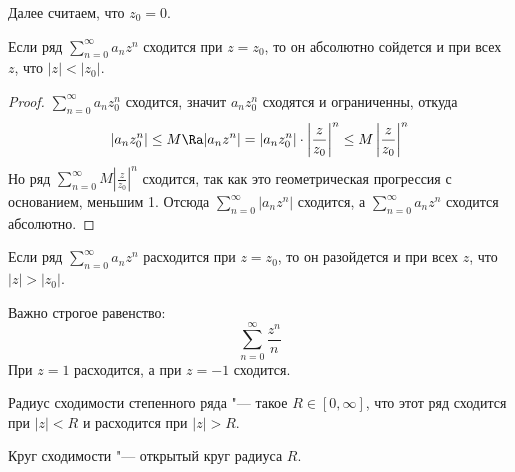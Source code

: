 \begin{Rem}
	Далее считаем, что $z_0 = 0$.
\end{Rem}

\begin{theorem}[Абеля]
	Если ряд $\sum_{n=0}^\infty a_n z^n$ сходится при $z = z_0$, то он абсолютно сойдется и при всех $z$, что $|z| < |z_0|$.
\end{theorem}
\begin{proof}
	$\sum_{n=0}^\infty a_n z_0^n$ сходится, значит $a_n z_0^n$ сходятся и ограниченны, откуда
	\begin{gather*}
		|a_n z_0^n| \le M
		\Ra |a_n z^n| = |a_n z_0^n| \cdot \left| \frac{z}{z_0} \right|^n \le M \left| \frac{z}{z_0} \right|^n
	\end{gather*}
	Но ряд $\sum_{n=0}^\infty M \left| \frac{z}{z_0} \right|^n$ сходится, так как это геометрическая прогрессия с основанием, меньшим 1.
	Отсюда $\sum_{n=0}^\infty |a_n z^n|$ сходится, а $\sum_{n=0}^\infty a_n z^n$ сходится абсолютно.
\end{proof}

\begin{conseq}
	Если ряд $\sum_{n=0}^\infty a_n z^n$ расходится при $z = z_0$, то он разойдется и при всех $z$, что $|z| > |z_0|$.
\end{conseq}

\begin{exmp}
	Важно строгое равенство:
	\[ \sum_{n=0}^\infty \frac{z^n}n \]
	При $z = 1$ расходится, а при $z = -1$ сходится.
\end{exmp}

\begin{Def}
	Радиус сходимости степенного ряда "--- такое $R \in [0, \infty]$, что этот ряд сходится при $|z| < R$ и расходится при $|z| > R$.
\end{Def}

\begin{Def}
	Круг сходимости "--- открытый круг радиуса $R$.
\end{Def}

